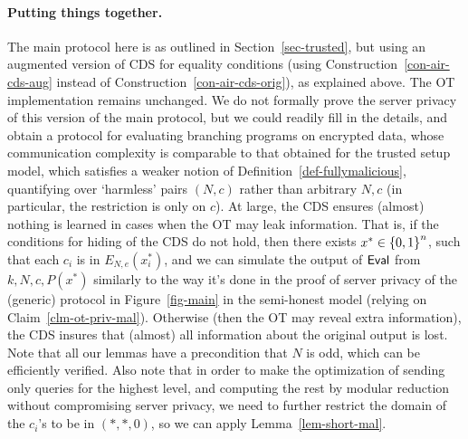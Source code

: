 \documentclass[11pt]{article}
\newcommand{\eval}{{\sf Eval}}
\newcommand{\encdj}{{E}_{N,e}}
\newcommand\ot{\mbox{OT}\xspace}
\newcommand{\mathify}[1]{\ifmmode{#1}\else\mbox{$#1$}\fi}
\newcommand{\set}[2][]{\mathify{{\left\{#2\right\}}^{#1}}}
\newcommand{\bools}[1][]{\set[#1]{0,1}}
\begin{document}
\paragraph{Putting things together.}
The main protocol here is as outlined in Section~\ref{sec-trusted}, but using an augmented version of CDS for equality conditions
(using Construction~\ref{con-air-cds-aug} instead of Construction~\ref{con-air-cds-orig}), as explained above. The OT implementation remains unchanged.
We do not formally prove the server privacy of this version of the main protocol, but we could readily fill in the details, and obtain a protocol
for evaluating branching programs on encrypted data, whose communication complexity is comparable
to that obtained for the trusted setup model, which satisfies a weaker notion of Definition~\ref{def-fullymalicious}, quantifying over `harmless' pairs $(N,c)$ rather than arbitrary $N,c$ (in particular, the restriction is only on $c$). At large, the CDS ensures (almost) nothing is learned in cases when the \ot may leak information.
That is, if the conditions for hiding of the CDS do not hold,
then there exists $x^*\in\bools[n]$, such that each $c_i$ is in $\encdj(x^*_i)$, and we can simulate
the output of $\eval$ from $k,N,c,P(x^*)$ similarly to the way it's done in the proof of server privacy of
the (generic) protocol in Figure~\ref{fig-main} in the semi-honest model
(relying on Claim~\ref{clm-ot-priv-mal}). Otherwise (then the \ot may reveal extra information), the CDS insures that (almost) all information about the original output is lost.
Note that all our lemmas have a precondition that $N$ is odd, which can be efficiently verified.
Also note that in order to make the optimization of sending only queries for the highest level, and computing the rest by modular reduction without compromising server privacy, we need to further restrict the domain of the $c_i$'s to be in $(*,*,0)$, so we can apply Lemma~\ref{lem-short-mal}.
\end{document}
